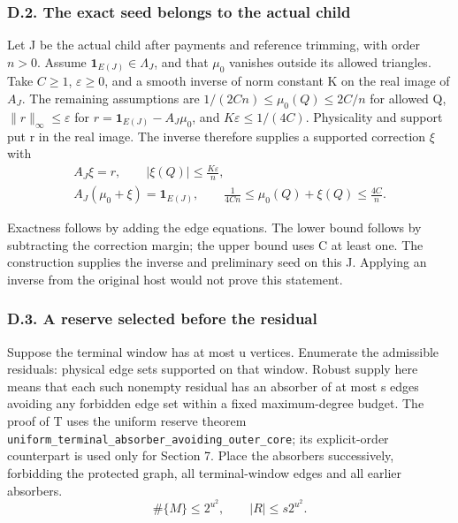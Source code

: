 \documentclass[english,11pt,a4paper]{article}
\newcounter{none}
\begin{document}
\subsubsection{D.2. The exact seed belongs to the actual child}\label{d.2.-the-exact-seed-belongs-to-the-actual-child}

Let J be the actual child after payments and reference trimming, with order \(n>0\). Assume \(\mathbf1_{E(J)}\in\Lambda_J\), and that \(\mu_0\) vanishes outside its allowed triangles. Take \(C\geq1\), \(\varepsilon\geq0\), and a smooth inverse of norm constant K on the real image of \(A_J\). The remaining assumptions are \(1/(2Cn)\leq\mu_0(Q)\leq2C/n\) for allowed Q, \(\|r\|_\infty\leq\varepsilon\) for \(r=\mathbf1_{E(J)}-A_J\mu_0\), and \(K\varepsilon\leq1/(4C)\). Physicality and support put r in the real image. The inverse therefore supplies a supported correction \(\xi\) with
\[\begin{gathered}A_J\xi=r,\qquad |\xi(Q)|\leq\frac{K\varepsilon}{n},\\
A_J(\mu_0+\xi)=\mathbf1_{E(J)},\qquad \frac1{4Cn}\leq\mu_0(Q)+\xi(Q)\leq\frac{4C}{n}.\end{gathered}\tag{D.5}\]

Exactness follows by adding the edge equations. The lower bound follows by subtracting the correction margin; the upper bound uses C at least one. The construction supplies the inverse and preliminary seed on this J. Applying an inverse from the original host would not prove this statement.

\subsubsection{D.3. A reserve selected before the residual}\label{d.3.-a-reserve-selected-before-the-residual}

Suppose the terminal window has at most u vertices. Enumerate the admissible residuals: physical edge sets supported on that window. Robust supply here means that each such nonempty residual has an absorber of at most s edges avoiding any forbidden edge set within a fixed maximum-degree budget. The proof of T uses the uniform reserve theorem \texttt{uniform\_\allowbreak{}terminal\_\allowbreak{}absorber\_\allowbreak{}avoiding\_\allowbreak{}outer\_\allowbreak{}core}; its explicit-order counterpart is used only for Section 7. Place the absorbers successively, forbidding the protected graph, all terminal-window edges and all earlier absorbers.
\[\#\{M\}\leq2^{u^2},\qquad |R|\leq s2^{u^2}. \tag{D.6}\]
\end{document}

